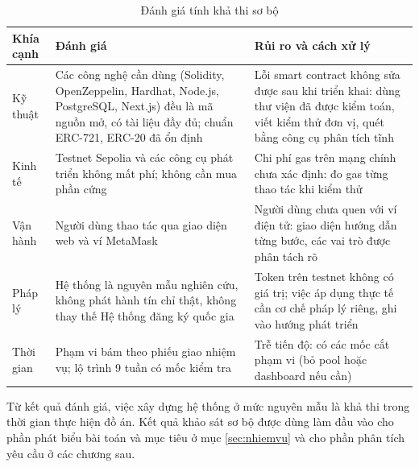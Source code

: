 \begin{table}[htbp]
    \centering
    \caption{Đánh giá tính khả thi sơ bộ}
    \label{tab:ks-khathi}
    \small
    \renewcommand{\arraystretch}{1.2}
    \begin{tabularx}{\textwidth}{|p{2.4cm}|X|X|}
        \hline
        \textbf{Khía cạnh} & \textbf{Đánh giá} & \textbf{Rủi ro và cách xử lý} \\
        \hline
        Kỹ thuật & Các công nghệ cần dùng (Solidity, OpenZeppelin, Hardhat, Node.js, PostgreSQL, Next.js) đều là mã nguồn mở, có tài liệu đầy đủ; chuẩn ERC-721, ERC-20 đã ổn định & Lỗi smart contract không sửa được sau khi triển khai: dùng thư viện đã được kiểm toán, viết kiểm thử đơn vị, quét bằng công cụ phân tích tĩnh \\
        \hline
        Kinh tế & Testnet Sepolia và các công cụ phát triển không mất phí; không cần mua phần cứng & Chi phí gas trên mạng chính chưa xác định: đo gas từng thao tác khi kiểm thử \\
        \hline
        Vận hành & Người dùng thao tác qua giao diện web và ví MetaMask & Người dùng chưa quen với ví điện tử: giao diện hướng dẫn từng bước, các vai trò được phân tách rõ \\
        \hline
        Pháp lý & Hệ thống là nguyên mẫu nghiên cứu, không phát hành tín chỉ thật, không thay thế Hệ thống đăng ký quốc gia & Token trên testnet không có giá trị; việc áp dụng thực tế cần cơ chế pháp lý riêng, ghi vào hướng phát triển \\
        \hline
        Thời gian & Phạm vi bám theo phiếu giao nhiệm vụ; lộ trình 9 tuần có mốc kiểm tra & Trễ tiến độ: có các mốc cắt phạm vi (bỏ pool hoặc dashboard nếu cần) \\
        \hline
    \end{tabularx}
\end{table}

Từ kết quả đánh giá, việc xây dựng hệ thống ở mức nguyên mẫu là khả thi trong thời gian thực hiện đồ án. Kết quả khảo sát sơ bộ được dùng làm đầu vào cho phần phát biểu bài toán và mục tiêu ở mục \ref{sec:nhiemvu} và cho phần phân tích yêu cầu ở các chương sau.

